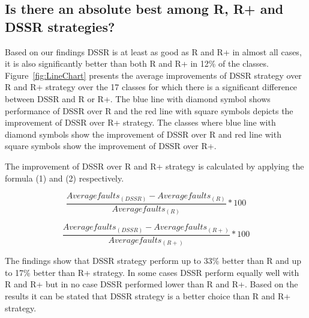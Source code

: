 \documentclass[conference]{IEEEtran}
\begin{document}
\subsection{Is there an absolute best among R, R+ and DSSR strategies?}
Based on our findings DSSR is at least as good as R and R+ in almost all cases, it is also significantly better than both R and R+ in 12\% of the classes. Figure~\ref{fig:LineChart} presents the average improvements of DSSR strategy over R and R+ strategy over the 17 classes for which there is a significant difference between DSSR and R or R+. The blue line with diamond symbol shows performance of DSSR over R and the red line with square symbols depicts the improvement of DSSR over R+ strategy. The classes where blue line with diamond symbols show the improvement of DSSR over R and red line with square symbols show the improvement of DSSR over R+. 

The improvement of DSSR over R and R+ strategy is calculated by applying the formula (1) and (2) respectively.

\begin{equation} \frac{Averagefaults_{(DSSR)} - Averagefaults_{(R)}}{Averagefaults_{(R)}} * 100  \end{equation}

\begin{equation} \frac{Averagefaults_{(DSSR)} - Averagefaults_{(R+)}}{Averagefaults_{(R+)}}  * 100 \end{equation}

The findings show that DSSR strategy perform up to 33\% better than R and up to 17\% better than R+ strategy. In some cases DSSR perform equally well with R and R+ but in no case DSSR performed lower than R and R+. Based on the results it can be stated that DSSR strategy is a better choice than R and R+ strategy. 
\end{document}
